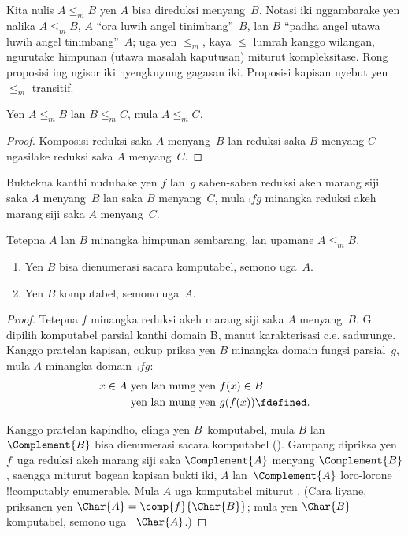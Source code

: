 \documentclass[../../../include/open-logic-section]{subfiles}
\begin{document}

Kita nulis $A \leq_m B$ yen $A$ bisa
direduksi menyang~$B$. Notasi iki
nggambarake yen nalika $A \leq_m B$,
$A$ ``ora luwih angel tinimbang''~$B$,
lan $B$ ``padha angel utawa luwih angel
tinimbang''~$A$; uga yen $\le_m$,
kaya $\le$ lumrah kanggo wilangan,
ngurutake himpunan (utawa masalah
kaputusan) miturut kompleksitase.
Rong proposisi ing ngisor iki
nyengkuyung gagasan iki. Proposisi
kapisan nyebut yen $\le_m$ transitif.

\begin{prop}
Yen $A \leq_m B$ lan $B \leq_m C$,
mula $A \leq_m C$.
\end{prop}

\begin{proof}
Komposisi reduksi saka $A$ menyang~$B$
lan reduksi saka $B$ menyang $C$
ngasilake reduksi saka $A$ menyang~$C$.
\end{proof}

\begin{prob}
Buktekna  kanthi
nuduhake yen $f$ lan~$g$ saben-saben
reduksi akeh marang siji saka $A$
menyang~$B$ lan saka $B$ menyang~$C$,
mula $\comp{f}{g}$ minangka reduksi
akeh marang siji saka $A$ menyang~$C$.
\end{prob}

\begin{prop}
Tetepna $A$ lan $B$ minangka himpunan
sembarang, lan upamane $A \leq_m B$.
\begin{enumerate}
\item Yen $B$ bisa dienumerasi sacara komputabel,
  semono uga~$A$.
\item Yen $B$ komputabel, semono uga~$A$.
\end{enumerate}
\end{prop}

\begin{proof}
Tetepna $f$ minangka reduksi akeh
marang siji saka $A$ menyang~$B$.
G dipilih komputabel parsial kanthi domain B, manut karakterisasi c.e. sadurunge.
Kanggo pratelan kapisan, cukup priksa
yen $B$ minangka domain fungsi parsial~$g$,
mula $A$ minangka domain~$\comp{f}{g}$:
\begin{align*}
x \in A & \text{ yen lan mung yen } f(x) \in B \\
& \text{ yen lan mung yen }  g(f(x)) \fdefined.
\end{align*}

Kanggo pratelan kapindho, elinga yen
$B$~komputabel, mula $B$ lan
~$\Complement{B}$ bisa dienumerasi
sacara komputabel
(). Gampang
dipriksa yen $f$~uga reduksi akeh
marang siji saka $\Complement{A}$
menyang $\Complement{B}$, saengga
miturut bagean kapisan bukti iki,
$A$ lan~$\Complement{A}$ loro-lorone
!!{computably
enumerable}. Mula $A$
uga komputabel miturut
. (Cara liyane,
priksanen yen $\Char{A} =
\comp{f}{\Char{B}}$; mula yen
$\Char{B}$ komputabel, semono uga
~$\Char{A}$.)
\end{proof}
\end{document}
